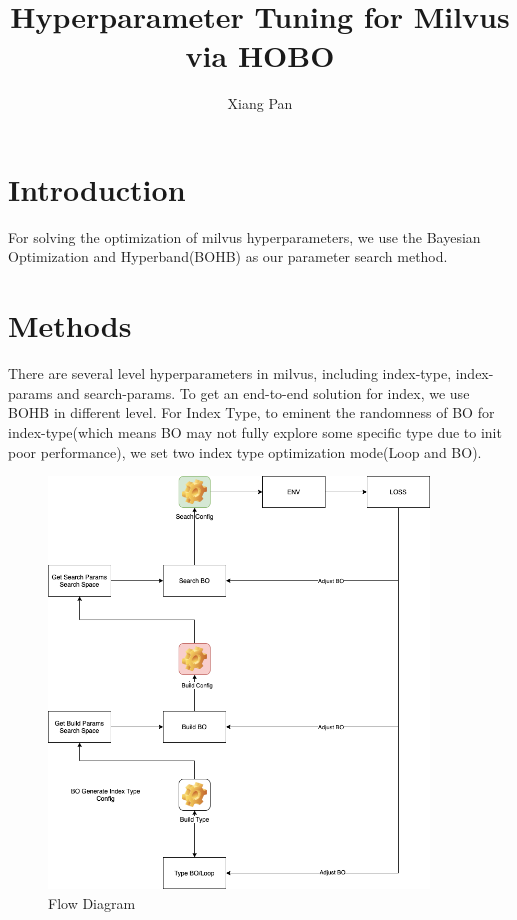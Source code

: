 \documentclass{ol-softwaremanual}
\title{Hyperparameter Tuning for Milvus via HOBO}
\author{Xiang Pan}
\begin{document}
\maketitle

\tableofcontents
\newpage

\section{Introduction}


For solving the optimization of milvus hyperparameters, we use the Bayesian Optimization and Hyperband(BOHB)\cite{falkner__BOHBRobustEfficient} as our parameter search method.

\section{Methods}
There are several level hyperparameters in milvus, including index-type, index-params and search-params.
To get an end-to-end solution for index, we use BOHB in different level. For Index Type, to eminent the randomness of BO for index-type(which means BO may not fully explore some specific type due to init poor performance), we set two index type optimization mode(Loop and BO).

\begin{figure}[!hpt]
    \centering
    \includegraphics[width=0.9\textwidth]{../figures/flow.png}
    \caption{\label{fig:flow}Flow Diagram}
\end{figure}
\end{document}
